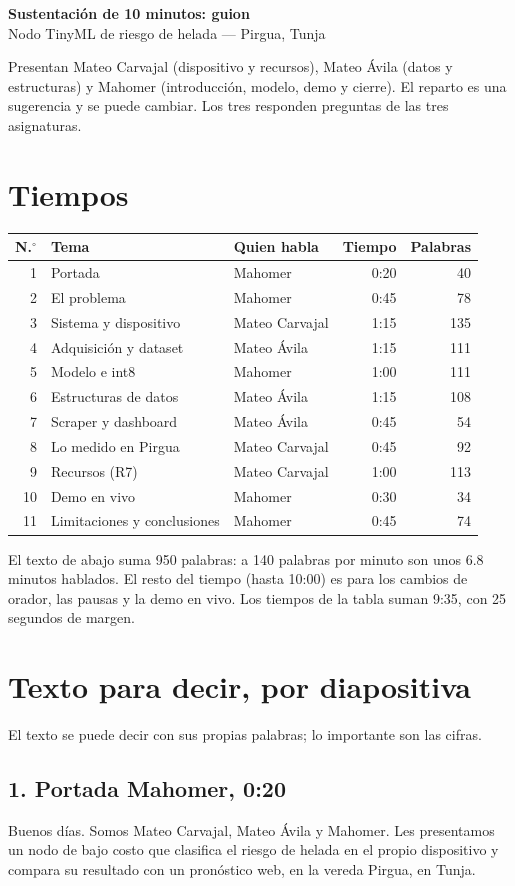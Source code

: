 \documentclass[11pt,a4paper]{article}
\begin{document}
{\LARGE\bfseries Sustentaci\'on de 10 minutos: guion}\\[2pt]
{\large Nodo TinyML de riesgo de helada --- Pirgua, Tunja}

\medskip
Presentan Mateo Carvajal (dispositivo y recursos), Mateo \'Avila (datos y estructuras) y Mahomer (introducci\'on, modelo, demo y cierre). El reparto es una sugerencia y se puede cambiar. Los tres responden preguntas de las tres asignaturas.

\section*{Tiempos}
\begin{tabular}{@{}rp{5.4cm}p{3cm}rr@{}}\toprule N.$^\circ$ & Tema & Quien habla & Tiempo & Palabras \\\midrule
1 & Portada & Mahomer & 0:20 & 40 \\
2 & El problema & Mahomer & 0:45 & 78 \\
3 & Sistema y dispositivo & Mateo Carvajal & 1:15 & 135 \\
4 & Adquisición y dataset & Mateo Ávila & 1:15 & 111 \\
5 & Modelo e int8 & Mahomer & 1:00 & 111 \\
6 & Estructuras de datos & Mateo Ávila & 1:15 & 108 \\
7 & Scraper y dashboard & Mateo Ávila & 0:45 & 54 \\
8 & Lo medido en Pirgua & Mateo Carvajal & 0:45 & 92 \\
9 & Recursos (R7) & Mateo Carvajal & 1:00 & 113 \\
10 & Demo en vivo & Mahomer & 0:30 & 34 \\
11 & Limitaciones y conclusiones & Mahomer & 0:45 & 74 \\
\bottomrule\end{tabular}

El texto de abajo suma 950 palabras: a 140 palabras por minuto son unos 6.8 minutos hablados. El resto del tiempo (hasta 10:00) es para los cambios de orador, las pausas y la demo en vivo. Los tiempos de la tabla suman 9:35, con 25 segundos de margen.

\section*{Texto para decir, por diapositiva}
El texto se puede decir con sus propias palabras; lo importante son las cifras.
\subsection*{1. Portada \hfill \small Mahomer, 0:20}
Buenos días. Somos Mateo Carvajal, Mateo Ávila y Mahomer. Les presentamos un nodo de bajo costo que clasifica el riesgo de helada en el propio dispositivo y compara su resultado con un pronóstico web, en la vereda Pirgua, en Tunja.
\end{document}
